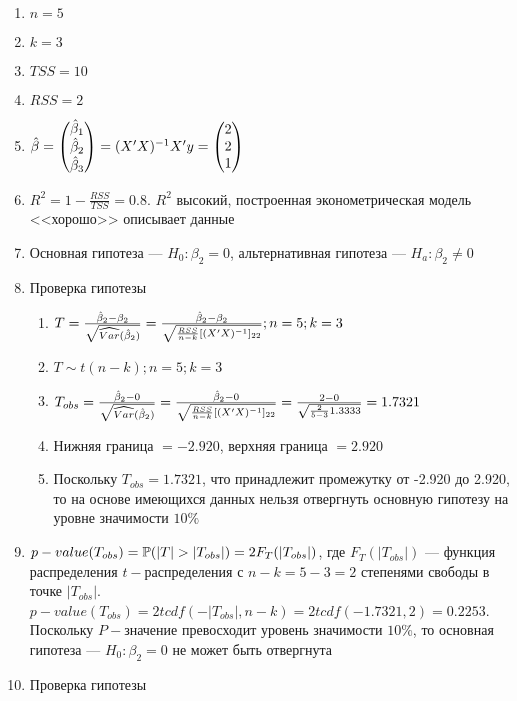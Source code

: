 \begin{solution}
\begin{enumerate}
\item $n = 5$
\item $k = 3$
\item $TSS = 10$
\item $RSS = 2$
\item $\hat{\beta} = \begin{pmatrix} \hat{\beta}_1 \\ \hat{\beta}_2 \\ \hat{\beta}_3 \end{pmatrix} = (X'X)^{-1}X'y = \begin{pmatrix} 2 \\ 2 \\ 1 \end{pmatrix}$
\item $R^2 = 1 - \frac {RSS}{TSS} = 0.8.$ $R^2$ высокий, построенная эконометрическая модель <<хорошо>> описывает данные
\item Основная гипотеза --- $H_0: \beta_2 = 0$, альтернативная гипотеза --- $H_a: \beta_2 \not= 0$
\item Проверка гипотезы
\begin{enumerate}
\item $T = \frac{\hat{\beta}_2 - \beta_2}{\sqrt{\widehat{Var}(\hat{\beta}_2)}} = \frac {\hat{\beta}_2 - \beta_2}{\sqrt{{\frac{RSS}{n-k}}[(X'X)^{-1}]_{22}}}; n = 5; k = 3$
\item $T \sim t(n-k); n = 5; k = 3$
\item $T_{obs} = \frac{\hat{\beta}_2 - 0}{\sqrt{\widehat{Var}(\hat{\beta}_2)}} = \frac {\hat{\beta}_2 - 0}{\sqrt{{\frac{RSS}{n-k}}[(X'X)^{-1}]_{22}}} = \frac{2-0}{\sqrt{{\frac{2}{5-3}}1.3333}} = 1.7321$
\item Нижняя граница $= -2.920$, верхняя граница $= 2.920$
\item Поскольку $T_{obs} = 1.7321$, что принадлежит промежутку от -2.920 до 2.920, то на основе имеющихся данных нельзя отвергнуть основную гипотезу на уровне значимости $10\%$
\end{enumerate}
\item $p-value(T_{obs}) = \P (|T|>|T_{obs}|) = 2F_{T}(|T_{obs}|)$, где $F_{T}(|T_{obs}|)$ --- функция распределения $t-$распределения с $n - k = 5 - 3 = 2$ степенями свободы в точке $|T_{obs}|$. $p-value(T_{obs}) = 2tcdf(-|T_{obs}|, n - k) = 2tcdf(-1.7321,2) = 0.2253$. Поскольку $P-$значение превосходит уровень значимости $10\%$, то основная гипотеза --- $H_0: \beta_2 = 0$ не может быть отвергнута
\item Проверка гипотезы

\end{enumerate}
\end{solution}
